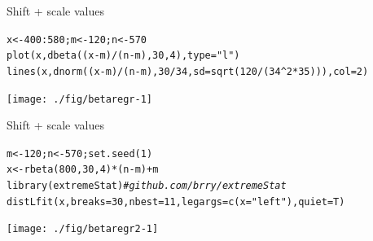 \documentclass[xcolor=table,       handout,    xcolor=dvipsnames]{beamer}\usepackage[]{graphicx}\usepackage[]{color}
\makeatletter
\newcommand{\hlnum}[1]{\textcolor[rgb]{0,0,0}{#1}}
\newcommand{\hlstr}[1]{\textcolor[rgb]{0.545,0.137,0.137}{#1}}
\newcommand{\hlcom}[1]{\textcolor[rgb]{0,0.392,0}{\textit{#1}}}
\newcommand{\hlopt}[1]{\textcolor[rgb]{0,0,0}{#1}}
\newcommand{\hlstd}[1]{\textcolor[rgb]{0,0,0}{#1}}
\newcommand{\hlkwb}[1]{\textcolor[rgb]{0,0,0}{#1}}
\newcommand{\hlkwc}[1]{\textcolor[rgb]{1,0,1}{#1}}
\newcommand{\hlkwd}[1]{\textcolor[rgb]{0,0,1}{#1}}
\newenvironment{kframe}{%
 \def\at@end@of@kframe{}%
 \ifinner\ifhmode%
  \def\at@end@of@kframe{\end{minipage}}%
  \begin{minipage}{\columnwidth}%
 \fi\fi%
 \def\FrameCommand##1{\hskip\@totalleftmargin \hskip-\fboxsep
 \colorbox{shadecolor}{##1}\hskip-\fboxsep
     \hskip-\linewidth \hskip-\@totalleftmargin \hskip\columnwidth}%
 \MakeFramed {\advance\hsize-\width
   \@totalleftmargin\z@ \linewidth\hsize
   \@setminipage}}%
 {\par\unskip\endMakeFramed%
 \at@end@of@kframe}
\newenvironment{knitrout}{}{} %
\makeatother
\begin{document}

\begin{frame}[fragile]{Shift + scale values}
\begin{knitrout}\small
{}\color{fgcolor}\begin{kframe}
\begin{alltt}
\hlstd{x} \hlkwb{<-} \hlnum{400}\hlopt{:}\hlnum{580}\hlstd{; m} \hlkwb{<-} \hlnum{120} \hlstd{; n} \hlkwb{<-} \hlnum{570}
\hlkwd{plot}\hlstd{(x,} \hlkwd{dbeta}\hlstd{((x}\hlopt{-}\hlstd{m)}\hlopt{/}\hlstd{(n}\hlopt{-}\hlstd{m),}\hlnum{30}\hlstd{,}\hlnum{4}\hlstd{),} \hlkwc{type}\hlstd{=}\hlstr{"l"}\hlstd{)}
\hlkwd{lines}\hlstd{(x,} \hlkwd{dnorm}\hlstd{((x}\hlopt{-}\hlstd{m)}\hlopt{/}\hlstd{(n}\hlopt{-}\hlstd{m),}\hlnum{30}\hlopt{/}\hlnum{34}\hlstd{,} \hlkwc{sd}\hlstd{=}\hlkwd{sqrt}\hlstd{(}\hlnum{120}\hlopt{/}\hlstd{(}\hlnum{34}\hlopt{^}\hlnum{2}\hlopt{*}\hlnum{35}\hlstd{))),} \hlkwc{col}\hlstd{=}\hlnum{2}\hlstd{)}
\end{alltt}
\end{kframe}

{\centering \texttt{[image: ./fig/betaregr-1]} 

}



\end{knitrout}
\end{frame}



\begin{frame}[fragile]{Shift + scale values}
\vspace{-1.5em}
\begin{knitrout}\footnotesize
{}\color{fgcolor}\begin{kframe}
\begin{alltt}
\hlstd{m} \hlkwb{<-} \hlnum{120} \hlstd{; n} \hlkwb{<-} \hlnum{570}\hlstd{;} \hlkwd{set.seed}\hlstd{(}\hlnum{1}\hlstd{)}
\hlstd{x} \hlkwb{<-} \hlkwd{rbeta}\hlstd{(}\hlnum{800}\hlstd{,}\hlnum{30}\hlstd{,}\hlnum{4}\hlstd{)} \hlopt{*} \hlstd{(n}\hlopt{-}\hlstd{m)}\hlopt{+}\hlstd{m}
\hlkwd{library}\hlstd{(extremeStat)} \hlcom{# github.com/brry/extremeStat}
\hlkwd{distLfit}\hlstd{(x,} \hlkwc{breaks}\hlstd{=}\hlnum{30}\hlstd{,} \hlkwc{nbest}\hlstd{=}\hlnum{11}\hlstd{,} \hlkwc{legargs}\hlstd{=}\hlkwd{c}\hlstd{(}\hlkwc{x}\hlstd{=}\hlstr{"left"}\hlstd{),} \hlkwc{quiet}\hlstd{=T)}
\end{alltt}
\end{kframe}

{\centering \texttt{[image: ./fig/betaregr2-1]} 

}



\end{knitrout}
\end{frame}
\end{document}
